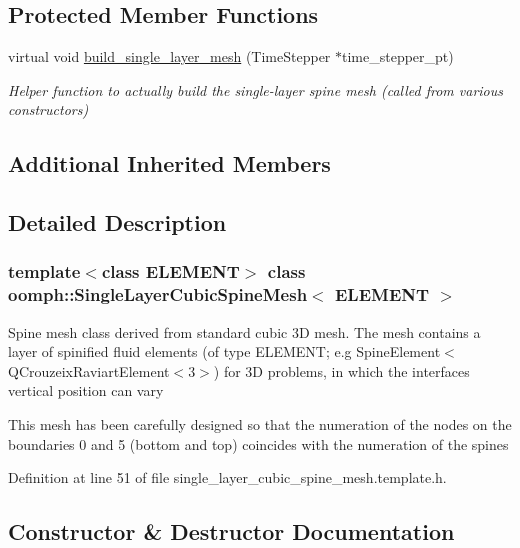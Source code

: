 \subsection*{Protected Member Functions}
\begin{DoxyCompactItemize}
\item 
virtual void \hyperlink{classoomph_1_1SingleLayerCubicSpineMesh_a975e6943dbdcf2474c78261d3ec00f28}{build\+\_\+single\+\_\+layer\+\_\+mesh} (Time\+Stepper $\ast$time\+\_\+stepper\+\_\+pt)
\begin{DoxyCompactList}\small\item\em Helper function to actually build the single-\/layer spine mesh (called from various constructors) \end{DoxyCompactList}\end{DoxyCompactItemize}
\subsection*{Additional Inherited Members}


\subsection{Detailed Description}
\subsubsection*{template$<$class E\+L\+E\+M\+E\+NT$>$\newline
class oomph\+::\+Single\+Layer\+Cubic\+Spine\+Mesh$<$ E\+L\+E\+M\+E\+N\+T $>$}

Spine mesh class derived from standard cubic 3D mesh. The mesh contains a layer of spinified fluid elements (of type E\+L\+E\+M\+E\+NT; e.\+g Spine\+Element$<$Q\+Crouzeix\+Raviart\+Element$<$3$>$) for 3D problems, in which the interface\textquotesingle{}s vertical position can vary

This mesh has been carefully designed so that the numeration of the nodes on the boundaries 0 and 5 (bottom and top) coincides with the numeration of the spines 

Definition at line 51 of file single\+\_\+layer\+\_\+cubic\+\_\+spine\+\_\+mesh.\+template.\+h.



\subsection{Constructor \& Destructor Documentation}
\mbox{\label{classoomph_1_1SingleLayerCubicSpineMesh_a99a1c68b949c75b5afc9bb0eb93fec3e}} 
